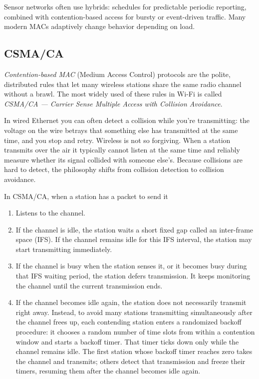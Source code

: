 Sensor networks often use hybrids: schedules for predictable periodic reporting, combined with contention-based access for bursty or event-driven traffic. Many modern MACs adaptively change behavior depending on load.

\subsection{CSMA/CA}
\textit{Contention-based MAC} (Medium Access Control) protocols are the polite, distributed rules that let many wireless stations share the same radio channel without a brawl. The most widely used of these rules in Wi-Fi is called \textit{CSMA/CA — Carrier Sense Multiple Access with Collision Avoidance}.

In wired Ethernet you can often detect a collision while you’re transmitting: the voltage on the wire betrays that something else has transmitted at the same time, and you stop and retry. Wireless is not so forgiving. When a station transmits over the air it typically cannot listen at the same time and reliably measure whether its signal collided with someone else’s. Because collisions are hard to detect, the philosophy shifts from collision detection to collision avoidance.

In CSMA/CA, when a station has a packet to send it
\begin{enumerate}
    \item Listens to the channel. 
    \item If the channel is idle, the station waits a short fixed gap called an inter-frame space (IFS). If the channel remains idle for this IFS interval, the station may start transmitting immediately. 
    \item If the channel is busy when the station senses it, or it becomes busy during that IFS waiting period, the station defers transmission. It keeps monitoring the channel until the current transmission ends.
    \item If the channel becomes idle again, the station does not necessarily transmit right away. Instead, to avoid many stations transmitting simultaneously after the channel frees up, each contending station enters a randomized backoff procedure: it chooses a random number of time slots from within a contention window and starts a backoff timer. That timer ticks down only while the channel remains idle. The first station whose backoff timer reaches zero takes the channel and transmits; others detect that transmission and freeze their timers, resuming them after the channel becomes idle again.
\end{enumerate}

